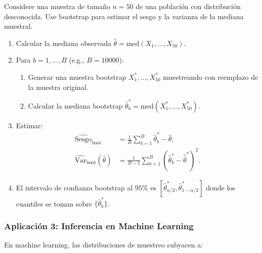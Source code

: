 \begin{ejemplo}
 \label{exmp:3.2.8}
Considere una muestra de tama\~no $n = 50$ de una poblaci\'on con distribuci\'on
desconocida. Use bootstrap para estimar el sesgo y la varianza de la mediana
muestral.
\end{ejemplo}

\begin{solucion}
\begin{enumerate}
 \item Calcular la mediana observada $\hat{\theta} = \text{med}(X_1, \ldots, X_{50})$.
 \item Para $b = 1, \ldots, B$ (e.g., $B = 10000$):
   \begin{enumerate}
    \item Generar una muestra bootstrap $X_1^*, \ldots, X_{50}^*$ muestreando con
    reemplazo de la muestra original.
    \item Calcular la mediana bootstrap $\hat{\theta}_b^* = \text{med}(X_1^*, \ldots, X_{50}^*)$.
   \end{enumerate}
 \item Estimar:
   \begin{align}
    \widehat{\text{Sesgo}}_{\text{boot}} &= \frac{1}{B}\sum_{b=1}^B \hat{\theta}_b^* - \hat{\theta}, \\
    \widehat{\text{Var}}_{\text{boot}}(\hat{\theta}) &= \frac{1}{B-1}\sum_{b=1}^B (\hat{\theta}_b^* - \bar{\hat{\theta}}^*)^2.
   \end{align}
 \item El intervalo de confianza bootstrap al $95\%$ es
 $[\hat{\theta}_{\alpha/2}^*, \hat{\theta}_{1-\alpha/2}^*]$ donde los cuantiles
 se toman sobre $\{\hat{\theta}_b^*\}$.
\end{enumerate}
\end{solucion}



\subsubsection{Aplicaci\'on 3: Inferencia en Machine Learning}

En machine learning, las distribuciones de muestreo subyacen a:

